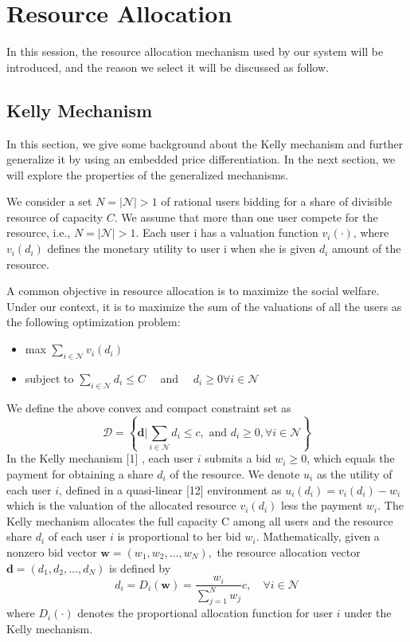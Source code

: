 \chapter{Resource Allocation}
\label{chap:resource}

In this session, the resource allocation mechanism used by our system will be introduced, and the reason we select it will be discussed as follow\cite{yang_price_2013}.

\section{Kelly Mechanism}

In this section, we give some background about the Kelly mechanism and further generalize it by using an embedded price differentiation. In the next section, we will explore the properties of the generalized mechanisms.

We consider a set $N=|\mathscr{N}|>1$ of rational users bidding for a share of divisible resource of capacity $C$. We assume that more than one user compete for the resource, i.e., $N=|\mathscr{N}|>1$. Each user i has a valuation function $v_{i}(\cdot)$, where $v_{i}\left(d_{i}\right)$ defines the monetary utility to user i when she is given $d_{i}$ amount of the resource.

A common objective in resource allocation is to maximize the social welfare. Under our context, it is to maximize the sum of the valuations of all the users as the following optimization problem:

\begin{itemize}
\item max           $\sum_{i \in \mathcal{N}} v_{i}\left(d_{i}\right)$
\item subject to    $\sum_{i \in \mathcal{N}} d_{i} \leq C \quad$ and $\quad d_{i} \geq 0 \forall i \in \mathcal{N}$
\end{itemize}

We define the above convex and compact constraint set as
$$
\mathscr{D}=\left\{\mathbf{d} | \sum_{i \in \mathcal{N}} d_{i} \leq c, \text { and } d_{i} \geq 0, \forall i \in \mathcal{N}\right\}
$$
In the Kelly mechanism [1] , each user $i$ submits a bid $w_{i} \geq 0$, which equals the payment for obtaining a share $d_{i}$ of the resource. We denote $u_{i}$ as the utility of each user $i$, defined in a quasi-linear [12] environment as $u_{i}\left(d_{i}\right)=v_{i}\left(d_{i}\right)-w_{i}$
which is the valuation of the allocated resource $v_{i}\left(d_{i}\right)$ less the payment $w_{i}$. The Kelly mechanism allocates the full capacity
C among all users and the resource share $d_{i}$ of each user $i$ is proportional to her bid $w_{i} .$ Mathematically, given a nonzero bid vector $\mathbf{w}=\left(w_{1}, w_{2}, \ldots, w_{N}\right),$ the resource allocation vector $\mathbf{d}=\left(d_{1}, d_{2}, \ldots, d_{N}\right)$ is defined by
$$
d_{i}=D_{i}(\mathbf{w})=\frac{w_{i}}{\sum_{j=1}^{N} w_{j}} c, \quad \forall i \in \mathcal{N}
$$
where $D_{i}(\cdot)$ denotes the proportional allocation function for user $i$ under the Kelly mechanism.

